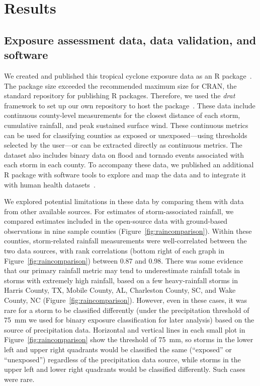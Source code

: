 \section*{Results}

\subsection*{Exposure assessment data, data validation, and software}

We created and published this tropical cyclone exposure data as an R
package~\parencite{hurricaneexposuredata}.  The package size exceeded the
recommended maximum size for \ac{CRAN}, the standard repository for publishing
R packages. Therefore, we used the \textit{drat} framework to set up our own
repository to host the package~\parencite{anderson2017hosting}. These data
include continuous county-level measurements for the closest distance of each
storm, cumulative rainfall, and peak sustained surface wind. These continuous
metrics can be used for classifying counties as exposed or unexposed---using
thresholds selected by the user---or can be extracted directly as continuous
metrics. The dataset also includes binary data on flood and tornado events
associated with each storm in each county. To accompany these data, we
published an additional R package with software tools to explore and map the
data and to integrate it with human health
datasets~\parencite{hurricaneexposure}.

We explored potential limitations in these data by comparing them with data
from other available sources.  For estimates of storm-associated rainfall, we
compared estimates included in the open-source data with ground-based
observations in nine sample counties (Figure~\ref{fig:raincomparison}). Within
these counties, storm-related rainfall measurements were well-correlated
between the two data sources, with rank correlations (bottom right of each
graph in Figure~\ref{fig:raincomparison}) between 0.87 and 0.98. 
There was some evidence that our primary rainfall metric may tend to
underestimate rainfall totals in storms with extremely high rainfall, based on
a few heavy-rainfall storms in Harris County, TX, Mobile County, AL, Charleston
County, SC, and Wake County, NC (Figure~\ref{fig:raincomparison}). However,
even in these cases, it was rare for a storm to be classified differently
(under the precipitation threshold of 75~\si{\milli\metre} we used for binary
exposure classification for later analysis) based on the source of
precipitation data. Horizontal and vertical lines in each small plot in
Figure~\ref{fig:raincomparison} show the threshold of 75~\si{\milli\metre}, so
storms in the lower left and upper right quadrants would be classified the same
(``exposed'' or ``unexposed'') regardless of the precipitation data source,
while storms in the upper left and lower right quadrants would be classified
differently. Such cases were rare.


